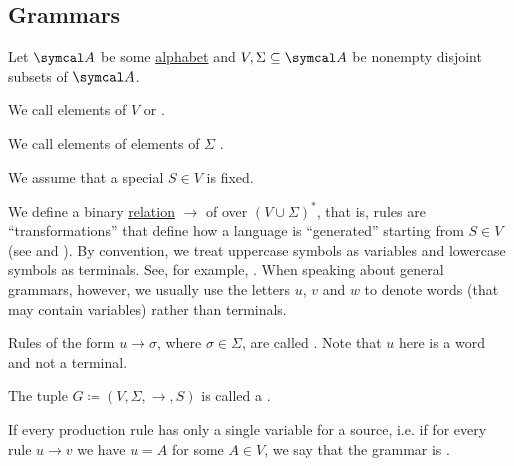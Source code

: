 \subsection{Grammars}\label{subsec:grammars}

\begin{definition}\label{def:grammar}
  Let \( \Cal{A} \) be some \hyperref[def:language/alphabet]{alphabet} and \( V, \Sigma \subseteq \Cal{A} \) be nonempty disjoint subsets of \( \Cal{A} \).

  \begin{DefEnum}
     We call elements of \( V \)  or .

     We call elements of elements of \( \Sigma \) .

     We assume that a special  \( S \in V \) is fixed.

     We define a binary \hyperref[def:relation]{relation} \( \to \) of  over \( (V \cup \Sigma)^* \), that is, rules are \enquote{transformations} that define how a language is \enquote{generated} starting from \( S \in V \) (see  and ). By convention, we treat uppercase symbols as variables and lowercase symbols as terminals. See, for example, . When speaking about general grammars, however, we usually use the letters \( u \), \( v \) and \( w \) to denote words (that may contain variables) rather than terminals.

     Rules of the form \( u \to \sigma \), where \( \sigma \in \Sigma \), are called . Note that \( u \) here is a word and not a terminal.

     The tuple \( G \coloneqq (V, \Sigma, \to, S) \) is called a .

     If every production rule has only a single variable for a source, i.e. if for every rule \( u \to v \) we have \( u = A \) for some \( A \in V \), we say that the grammar is .
  \end{DefEnum}
\end{definition}

